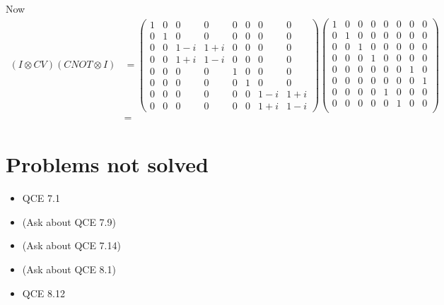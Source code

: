 \documentclass[10pt]{article}
\begin{document}
Now
\begin{align*}
(I \otimes CV)(CNOT \otimes I)
&= 
\begin{pmatrix}
1 & 0 & 0 & 0 & 0 & 0 & 0 & 0 \\
0 & 1 & 0 & 0 & 0 & 0 & 0 & 0 \\
0 & 0 & 1 - i & 1 + i & 0 & 0 & 0 & 0 \\
0 & 0 & 1 + i & 1 - i & 0 & 0 & 0 & 0 \\
\hline
0 & 0 & 0 & 0 & 1 & 0 & 0 & 0 \\
0 & 0 & 0 & 0 & 0 & 1 & 0 & 0 \\
0 & 0 & 0 & 0 & 0 & 0 & 1-i & 1+i \\
0 & 0 & 0 & 0 & 0 & 0 & 1+i & 1-i
\end{pmatrix}
\begin{pmatrix}
1 & 0 & 0 & 0 & 0 & 0 & 0 & 0 \\
0 & 1 & 0 & 0 & 0 & 0 & 0 & 0 \\
0 & 0 & 1 & 0 & 0 & 0 & 0 & 0 \\
0 & 0 & 0 & 1 & 0 & 0 & 0 & 0 \\
\hline 
0 & 0 & 0 & 0 & 0 & 0 & 1 & 0 \\
0 & 0 & 0 & 0 & 0 & 0 & 0 & 1\\
0 & 0 & 0 & 0 & 1 & 0 & 0 & 0 \\
0 & 0 & 0 & 0 & 0 & 1 & 0 & 0 \\ 
\end{pmatrix} \\
&= 
\end{align*}

\section*{Problems not solved}
\begin{itemize}
\item QCE 7.1 
\item (Ask about QCE 7.9)
\item (Ask about QCE 7.14)
\item (Ask about QCE 8.1)
\item QCE 8.12
\end{itemize}
\end{document}
